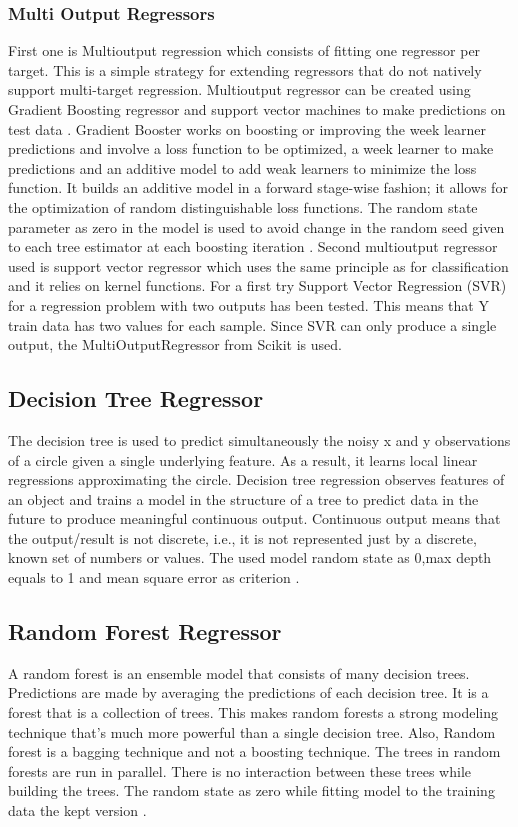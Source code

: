 \subsubsection{Multi Output Regressors}
First one is Multioutput regression which consists of fitting one regressor per target. This is a simple strategy for extending regressors that do not natively support multi-target regression. Multioutput regressor can be created using Gradient Boosting regressor and support vector machines to make predictions on test data \cite{scikit-learn}.\newline
Gradient Booster works on boosting or improving the week learner predictions and involve a loss function to be optimized, a week learner to make predictions and an additive model to add weak learners to minimize the loss function. It builds an additive model in a forward stage-wise fashion; it allows for the optimization of random distinguishable loss functions. The random state parameter as zero in the model is used to avoid change in the random seed given to each tree estimator at each boosting iteration \cite{scikit-learn:GradientBoostingRegressor}.\newline 
Second multioutput regressor used is support vector regressor which uses the same principle as for classification and it relies on kernel functions. For a first try Support Vector Regression (SVR) for a regression problem with two outputs has been tested. This means that Y train data has two values for each sample. Since SVR can only produce a single output, the MultiOutputRegressor from Scikit is used.
\subsection{Decision Tree Regressor}
The decision tree is used to predict simultaneously the noisy x and y observations of a circle given a single underlying feature. As a result, it learns local linear regressions approximating the circle. Decision tree regression observes features of an object and trains a model in the structure of a tree to predict data in the future to produce meaningful continuous output. Continuous output means that the output/result is not discrete, i.e., it is not represented just by a discrete, known set of numbers or values. The used model random state as 0,max depth equals to 1 and mean square error as criterion\cite{tensorflow:tutorial} \cite{tensorflow:keras}.\newline
\subsection{Random Forest Regressor}
A random forest is an ensemble model that consists of many decision trees. Predictions are made by averaging the predictions of each decision tree. It is a forest that is a collection of trees. This makes random forests a strong modeling technique that’s much more powerful than a single decision tree. Also, Random forest is a bagging technique and not a boosting technique. The trees in random forests are run in parallel. There is no interaction between these trees while building the trees. The random state as zero while fitting model to the training data the kept version\cite{tensorflow:tutorial} \cite{tensorflow:keras}.\newline
